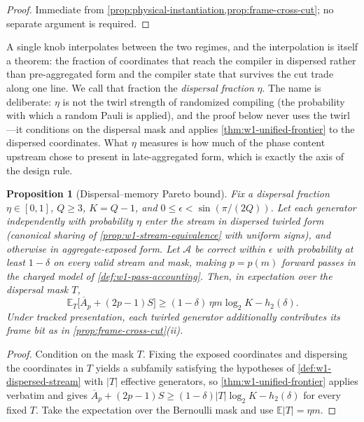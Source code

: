 \documentclass[aps,prx,reprint,floatfix,superscriptaddress]{revtex4-2}
\newtheorem{proposition}{Proposition}
\begin{document}
\begin{proof}
Immediate from
\cref{prop:physical-instantiation,prop:frame-cross-cut}; no separate
argument is required.
\end{proof}

A single knob interpolates between the two regimes, and the
interpolation is itself a theorem: the fraction of coordinates that
reach the compiler in dispersed rather than pre-aggregated form and the
compiler state that survives the cut trade along one line.  We call
that fraction the \emph{dispersal fraction} $\eta$.  The name is
deliberate: $\eta$ is not the twirl strength of randomized compiling
(the probability with which a random Pauli is applied), and the proof
below never uses the twirl---it conditions on the dispersal mask and
applies \cref{thm:w1-unified-frontier} to the dispersed coordinates.
What $\eta$ measures is how much of the phase content upstream chose to
present in late-aggregated form, which is exactly the axis of the
design rule.

\begin{proposition}[Dispersal--memory Pareto bound]
\label{prop:eta-pareto}
Fix a dispersal fraction $\eta\in[0,1]$, $Q\geq3$, $K=Q-1$, and
$0\leq\epsilon<\sin(\pi/(2Q))$.  Let each generator independently with
probability $\eta$ enter the stream in dispersed twirled form (canonical
sharing of \cref{prop:w1-stream-equivalence} with uniform signs), and
otherwise in aggregate-exposed form.  Let $\mathcal A$ be correct within
$\epsilon$ with probability at least $1-\delta$ on every valid stream
and mask, making $p=p(m)$ forward passes in the charged model of
\cref{def:w1-pass-accounting}.  Then, in expectation over the dispersal
mask $T$,
\begin{equation}\label{eq:eta-pareto}
 \mathbb E_T\bigl[\overline A_p+(2p-1)S\bigr]
 \geq(1-\delta)\,\eta m\log_2K-h_2(\delta).
\end{equation}
Under tracked presentation, each twirled generator additionally
contributes its frame bit as in \cref{prop:frame-cross-cut}(ii).
\end{proposition}

\begin{proof}
Condition on the mask $T$.  Fixing the exposed coordinates and
dispersing the coordinates in $T$ yields a subfamily satisfying the
hypotheses of \cref{def:w1-dispersed-stream} with $|T|$ effective
generators, so \cref{thm:w1-unified-frontier} applies verbatim and
gives $\overline A_p+(2p-1)S\geq(1-\delta)|T|\log_2K-h_2(\delta)$ for
every fixed $T$.  Take the expectation over the Bernoulli mask and use
$\mathbb E|T|=\eta m$.
\end{proof}
\end{document}

